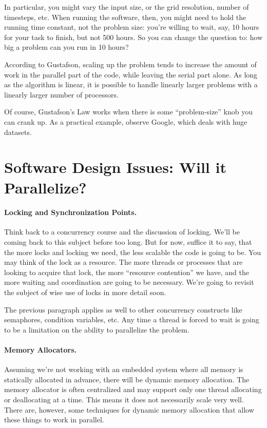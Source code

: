 In particular, you might vary the input size, or the grid resolution,
number of timesteps, etc. When running the software, then, you might
need to hold the running time constant, not the problem size: you're
willing to wait, say, 10 hours for your task to finish, but not 500
hours. So you can change the question to: how big a problem can you
run in 10 hours?

According to Gustafson, scaling up the problem tends to increase the
amount of work in the parallel part of the code, while leaving the
serial part alone. As long as the algorithm is linear, it is possible
to handle linearly larger problems with a linearly larger number of
processors.

Of course, Gustafson's Law works when there is some ``problem-size''
knob you can crank up.  As a practical example, observe Google, which
deals with huge datasets.


\section*{Software Design Issues: Will it Parallelize?}


\paragraph{Locking and Synchronization Points.}
Think back to a concurrency course and the discussion of locking. We'll be coming back to this subject before too long. But for now, suffice it to say, that the more locks and locking we need, the less scalable the code is going to be. You may think of the lock as a resource. The more threads or processes that are looking to acquire that lock, the more ``resource contention'' we have, and the more waiting and coordination are going to be necessary. We're going to revisit the subject of wise use of locks in more detail soon.

The previous paragraph applies as well to other concurrency constructs like semaphores, condition variables, etc. Any time a thread is forced to wait is going to be a limitation on the ability to parallelize the problem.

\paragraph{Memory Allocators.}
Assuming we're not working with an embedded system where all memory is statically allocated in advance, there will be dynamic memory allocation. The memory allocator is often centralized and may support only one thread allocating or deallocating at a time. This means it does not necessarily scale very well. There are, however, some techniques for dynamic memory allocation that allow these things to work in parallel.

